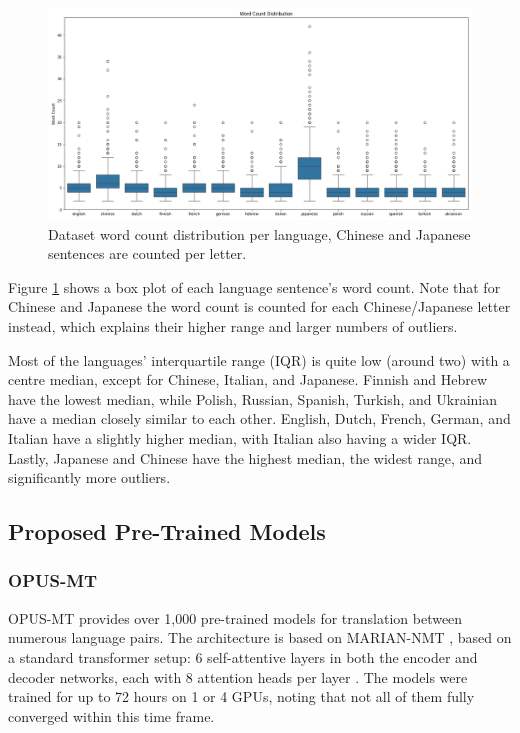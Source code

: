 \documentclass[a4paper, 11pt]{article}
\begin{document}
\begin{figure}[htbp]
    \centering
    \includegraphics[width=1\linewidth]{figures/word_count_box.png}
    \caption{Dataset word count distribution per language, Chinese and Japanese sentences are counted per letter.}
    \label{fig:word_count_box}
\end{figure}

Figure \ref{fig:word_count_box} shows a box plot of each language sentence's word count. Note that for Chinese and Japanese the word count is counted for each Chinese/Japanese letter instead, which explains their higher range and larger numbers of outliers.

Most of the languages' interquartile range (IQR) is quite low (around two) with a centre median, except for Chinese, Italian, and Japanese. Finnish and Hebrew have the lowest median, while Polish, Russian, Spanish, Turkish, and Ukrainian have a median closely similar to each other. English, Dutch, French, German, and Italian have a slightly higher median, with Italian also having a wider IQR. Lastly, Japanese and Chinese have the highest median, the widest range, and significantly more outliers.

\subsection{Proposed Pre-Trained Models}

\subsubsection{OPUS-MT}

OPUS-MT \cite{tiedemann-2023-democratizing,tiedemann-2020-opus-mt} provides over 1,000 pre-trained models for translation between numerous language pairs. The architecture is based on MARIAN-NMT \cite{mariannmt}, based on a standard transformer setup: 6 self-attentive layers in both the encoder and decoder networks, each with 8 attention heads per layer \cite{tiedemann-2020-opus-mt}. The models were trained for up to 72 hours on 1 or 4 GPUs, noting that not all of them fully converged within this time frame.
\end{document}
